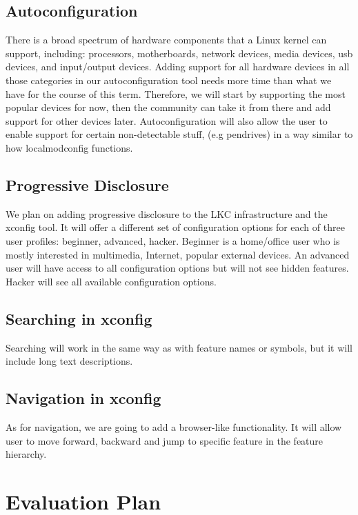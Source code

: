 \documentclass{chi2009}
\begin{document}
\subsection{Autoconfiguration}

There is a broad spectrum of hardware components that a Linux kernel can support, including: processors, motherboards, network devices, media devices, usb devices, and input/output devices. Adding support for all hardware devices in all those categories in our autoconfiguration tool needs more time than what we have for the course of this term. Therefore, we will start by supporting the most popular devices for now, then the community can take it from there and add support for other devices later. Autoconfiguration will also allow the user to enable support for certain non-detectable stuff, (e.g pendrives) in a way similar to how \textsf{localmodconfig} functions.

\subsection{Progressive Disclosure}

We plan on adding progressive disclosure to the LKC infrastructure and the xconfig tool. It will offer a different set of configuration options for each of three user profiles: beginner, advanced, hacker. Beginner is a home/office user who is mostly interested in multimedia, Internet, popular external devices. An advanced user will have access to all configuration options but will not see hidden features. Hacker will see all available configuration options.

\subsection{Searching in xconfig}

Searching will work in the same way as with feature names or symbols, but it will include long text descriptions.

\subsection{Navigation in xconfig}

As for navigation, we are going to add a browser-like functionality. It will allow user to move forward, backward and jump to specific feature in the feature hierarchy.

\section{Evaluation Plan}
\end{document}
